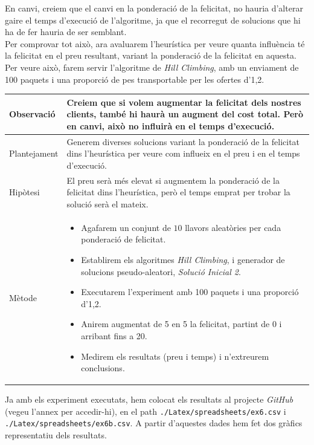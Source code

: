 \documentclass[a4paper]{article}
\begin{document}
	En canvi, creiem que el canvi en la ponderació de la felicitat, no hauria d'alterar gaire el temps d'execució de l'algoritme, ja que el recorregut de solucions que hi ha de fer hauria de ser semblant. \\
	
	Per comprovar tot això, ara avaluarem l'heurística per veure quanta influència té la felicitat en el preu resultant, variant la ponderació de la felicitat en aquesta. Per veure això, farem servir l'algoritme de \textit{Hill Climbing}, amb un enviament de 100 paquets i una proporció de pes transportable per les ofertes d'1,2. \\
	
	\begin{table}[ht]
		\centering
		\begin{tabular}{|l|p{10cm}|}
			\hline
			Observació & Creiem que si volem augmentar la felicitat dels nostres clients, també hi haurà un augment del cost total. Però en canvi, això no influirà en el temps d'execució. \\
			\hline
			Plantejament & Generem diverses solucions variant la ponderació de la felicitat dins l'heurística per veure com influeix en el preu i en el temps d'execució. \\
			\hline
			Hipòtesi & El preu serà més elevat si augmentem la ponderació de la felicitat dins l'heurística, però el temps emprat per trobar la solució serà el mateix. \\
			\hline
			Mètode & 
			\begin{itemize}
				\item Agafarem un conjunt de $10$ llavors aleatòries per cada ponderació de felicitat.
				\item Establirem els algoritmes \textit{Hill Climbing}, i generador de solucions pseudo-aleatori, \textit{Solució Inicial 2}.
				\item Executarem l'experiment amb 100 paquets i una proporció d'1,2.
				\item Anirem augmentat de 5 en 5 la felicitat, partint de 0 i arribant fins a 20.
				\item Medirem els resultats (preu i temps) i n'extreurem conclusions.
			\end{itemize} \\
			\hline
		\end{tabular}
		\label{tab:exp6_apartats}
	\end{table}
	
	Ja amb els experiment executats, hem colocat els resultats al projecte \textit{GitHub} (vegeu l'annex per accedir-hi), en el path \texttt{./Latex/spreadsheets/ex6.csv} i \texttt{./Latex/spreadsheets/ex6b.csv}. A partir d'aquestes dades hem fet dos gràfics representatiu dels resultats.
	
\end{document}
